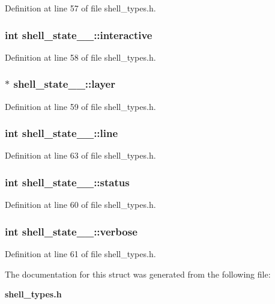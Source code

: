 Definition at line 57 of file shell\_\-types.h.
\subsubsection[{interactive}]{\setlength{\rightskip}{0pt plus 5cm}int {\bf shell\_\-state\_\-\_\-::interactive}}\label{structshell__state_____ac19530794ea54d353fd0311833918b58}


Definition at line 58 of file shell\_\-types.h.
\subsubsection[{layer}]{$\ast$ {\bf shell\_\-state\_\-\_\-::layer}}\label{structshell__state_____a6d0f8ff17a863ff9b78024b332d4f002}


Definition at line 59 of file shell\_\-types.h.
\subsubsection[{line}]{\setlength{\rightskip}{0pt plus 5cm}int {\bf shell\_\-state\_\-\_\-::line}}\label{structshell__state_____af791667e865551ff1ef99e5bd7fb5ebd}


Definition at line 63 of file shell\_\-types.h.
\subsubsection[{status}]{\setlength{\rightskip}{0pt plus 5cm}int {\bf shell\_\-state\_\-\_\-::status}}\label{structshell__state_____aecc070dc56b42065153b28df3b48731d}


Definition at line 60 of file shell\_\-types.h.
\subsubsection[{verbose}]{\setlength{\rightskip}{0pt plus 5cm}int {\bf shell\_\-state\_\-\_\-::verbose}}\label{structshell__state_____af1e01f5e2ea55d14d3e2dbafb9313262}


Definition at line 61 of file shell\_\-types.h.

The documentation for this struct was generated from the following file:\begin{DoxyCompactItemize}
\item 
{\bf shell\_\-types.h}\end{DoxyCompactItemize}
